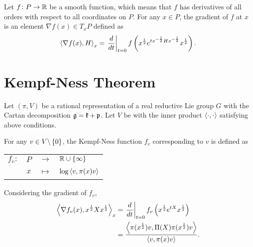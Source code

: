 \documentclass[suri,pdfbookmark]{engsuribt} %
\begin{document}
  Let $f \colon P \rightarrow \mathbb{R}$ be a smooth function, which means that $f$ has derivatives of all orders with respect to all coordinates on $P$. For any $x \in P$, the gradient of $f$ at $x$ is an element $\nabla f(x) \in T_xP$ defined as
  \begin{equation*}
    \left\langle \nabla f(x), H \right\rangle_x = \left.\frac{d}{dt}\right\lvert_{t=0} f\left(x^{\frac{1}{2}} e^{tx^{-\frac{1}{2}}Hx^{-\frac{1}{2}}} x^{\frac{1}{2}}\right).
  \end{equation*}

  \section{Kempf-Ness Theorem}

  Let $(\pi,V)$ be a rational representation of a real reductive Lie group $G$ with the Cartan decomposition $\mathfrak{g} = \mathfrak{k}+\mathfrak{p}$. Let $V$ be with the inner product $\left\langle \cdot,\cdot \right\rangle$ satisfying above conditions.

  For any $v \in V \backslash \left\{0\right\}$, the Kempf-Ness function $f_v$ corresponding to $v$ is defined as
  \begin{center}
    \begin{tabular}{l c c l}
      $f_v \colon$ & $P$ & $\longrightarrow$ & $\mathbb{R} \cup \left\{\infty\right\}$ \\
      ~& $x$ & $\longmapsto$ & $\log \left\langle v,\pi(x)v \right\rangle$
    \end{tabular}
  \end{center}
  Considering the gradient of $f_v$,
  \begin{equation*}
    \begin{split}
      \left\langle \nabla f_v(x),x^{\frac{1}{2}}Xx^{\frac{1}{2}} \right\rangle_x &= \left.\frac{d}{dt}\right\lvert_{t=0}f_v\left(x^{\frac{1}{2}}e^{tX}x^{\frac{1}{2}}\right) \\
      &= \frac{\left\langle \pi(x^{\frac{1}{2}})v,\Pi(X)\pi(x^{\frac{1}{2}})v \right\rangle}{\left\langle v,\pi(x)v \right\rangle}.
    \end{split}
  \end{equation*}
\end{document}

